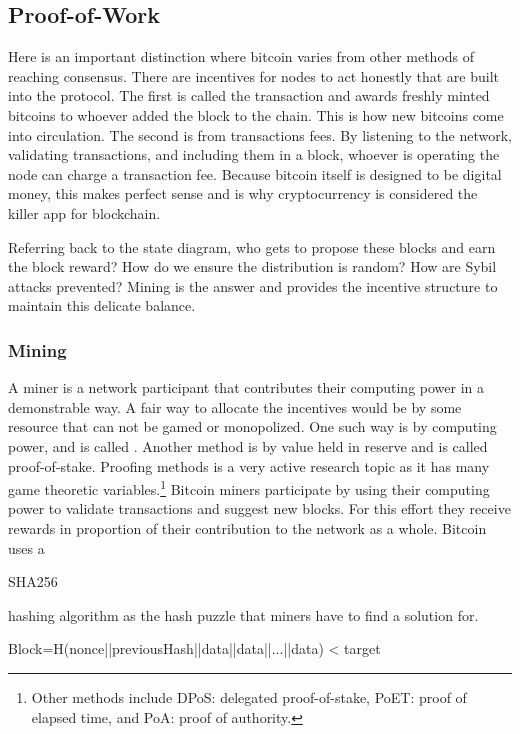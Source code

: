 \subsection*{Proof-of-Work}\label{Se:POW}
Here is an important distinction where bitcoin varies from other methods of reaching consensus. There are incentives for nodes to act honestly that are built into the protocol. The first is called the  transaction and awards freshly minted bitcoins to whoever added the block to the chain. This is how new bitcoins come into circulation. The second is from transactions fees. By listening to the network, validating transactions, and including them in a block, whoever is operating the node can charge a transaction fee. Because bitcoin itself is designed to be digital money, this makes perfect sense and is why cryptocurrency is considered the killer app for blockchain. 

Referring back to the state diagram, who gets to propose these blocks and earn the block reward? How do we ensure the distribution is random? How are Sybil attacks prevented? Mining is the answer and provides the incentive structure to maintain this delicate balance.

\subsubsection*{Mining}
A miner is a network participant that contributes their computing power in a demonstrable way. A fair way to allocate the incentives would be by some resource that can not be gamed or monopolized. One such way is by computing power, and is called . Another method is by value held in reserve and is called proof-of-stake. Proofing methods is a very active research topic as it has many game theoretic variables.\footnote{Other methods include DPoS: delegated proof-of-stake, PoET: proof of elapsed time, and PoA: proof of authority.} Bitcoin miners participate by using their computing power to validate transactions and suggest new blocks. For this effort they receive rewards in proportion of their contribution to the network as a whole. Bitcoin uses a \begin{code}SHA256\end{code} hashing algorithm as the hash puzzle that miners have to find a solution for.
\begin{center}
\begin{code}
	Block=H(nonce||previousHash||data||data||...||data) < target
\end{code}
\end{center}

